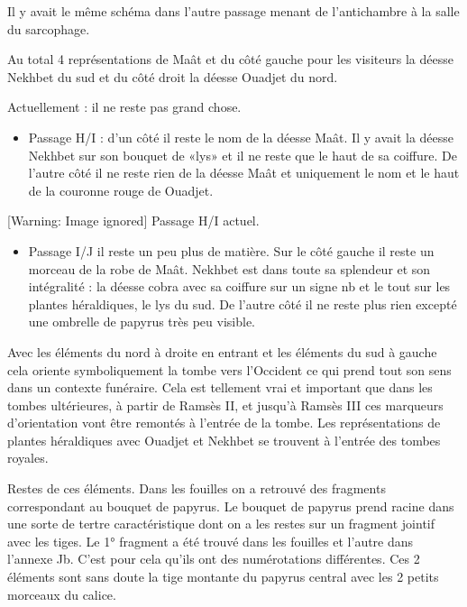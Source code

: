 \documentclass{article}
\begin{document}
Il y avait le même schéma dans l’autre passage menant de l’antichambre à
la salle du sarcophage.

Au total 4 représentations de Maât et du côté gauche pour les visiteurs
la déesse Nekhbet du sud et du côté droit la déesse Ouadjet du nord. 

Actuellement : il ne reste pas grand chose. 

\begin{itemize}
\item Passage H/I : d’un côté il reste le nom de la déesse Maât. Il y
avait la déesse Nekhbet sur son bouquet de «lys» et il ne reste que le
haut de sa coiffure. De l’autre côté il ne reste rien de la déesse Maât
et uniquement le nom et le haut de la couronne rouge de Ouadjet.
\end{itemize}
  [Warning: Image ignored] %
  Passage H/I actuel.

\begin{itemize}
\item Passage I/J il reste un peu plus de matière. Sur le côté gauche il
reste un morceau de la robe de Maât. Nekhbet est dans toute sa
splendeur et son intégralité : la déesse cobra avec sa coiffure sur un
signe nb et le tout sur les plantes héraldiques, le lys du sud. De
l’autre côté il ne reste plus rien excepté une ombrelle de papyrus très
peu visible.
\end{itemize}
Avec les éléments du nord à droite en entrant et les éléments du sud à
gauche cela oriente symboliquement la tombe vers l’Occident ce qui
prend tout son sens dans un contexte funéraire. Cela est tellement vrai
et important que dans les tombes ultérieures, à partir de  Ramsès II,
et jusqu’à Ramsès III ces marqueurs d’orientation vont être remontés à
l’entrée de la tombe. Les représentations de plantes héraldiques avec
Ouadjet et Nekhbet se trouvent à l’entrée des tombes royales.

Restes de ces éléments. Dans les fouilles on a retrouvé des fragments
correspondant au bouquet de papyrus. Le bouquet de papyrus prend racine
dans une sorte de tertre caractéristique dont on a les restes sur un
fragment jointif avec les tiges. Le 1° fragment a été trouvé dans les
fouilles et l’autre dans l’annexe Jb. C’est pour cela qu’ils ont des
numérotations différentes. Ces 2 éléments sont sans doute la tige
montante du papyrus central avec les 2 petits morceaux du calice.
\end{document}

